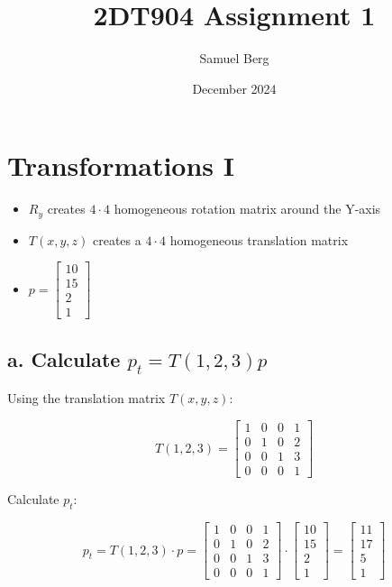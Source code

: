 \documentclass{article}
\title{2DT904 Assignment 1}
\author{Samuel Berg}
\date{December 2024}
\begin{document}
\maketitle

\tableofcontents
\newpage

\section{Transformations I}

\begin{itemize}
    \item $R_y$ creates $4\cdot4$ homogeneous rotation matrix around the Y-axis
    \item $T(x, y, z)$ creates a $4\cdot4$ homogeneous translation matrix
    \item $p = \begin{bmatrix}10 \\ 15 \\ 2 \\ 1\end{bmatrix}$
\end{itemize}

\subsection{a. Calculate $p_t = T(1, 2, 3)p$}

Using the translation matrix $T(x, y, z)$:

$$
T(1, 2, 3) = \begin{bmatrix}
1 & 0 & 0 & 1 \\
0 & 1 & 0 & 2 \\
0 & 0 & 1 & 3 \\
0 & 0 & 0 & 1
\end{bmatrix}
$$

Calculate $p_t$:

$$
p_t = T(1, 2, 3) \cdot p =
\begin{bmatrix}
1 & 0 & 0 & 1 \\
0 & 1 & 0 & 2 \\
0 & 0 & 1 & 3 \\
0 & 0 & 0 & 1
\end{bmatrix}
\cdot
\begin{bmatrix}
10 \\ 15 \\ 2 \\ 1
\end{bmatrix}
=
\begin{bmatrix}
11 \\ 17 \\ 5 \\ 1
\end{bmatrix}
$$
\end{document}
